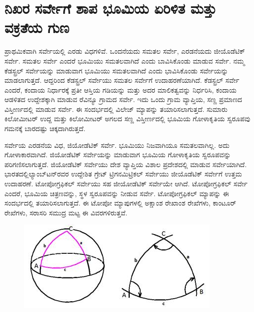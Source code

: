 
\chapter{ನಿಖರ ಸರ್ವೇಗೆ ಶಾಪ ಭೂಮಿಯ ಏರಿಳಿತ ಮತ್ತು ವಕ್ರತೆಯ ಗುಣ}

ಪ್ರಾಥಮಿಕವಾಗಿ ಸರ್ವೇಯಲ್ಲಿ ಎರಡು ವಿಧಗಳಿವೆ. ಒಂದನೆಯದು ಸಮತಲ ಸರ್ವೇ, ಎರಡನೆಯದು ಜೀಯೊಡೆಟಿಕ್​ ಸರ್ವೇ. ಸಮತಲ ಸರ್ವೇ ಎಂದರೆ ಭೂಮಿಯು ಸಮತಲವಾಗಿದೆ ಎಂದು ಬಾವಿಸಿಕೊಂಡು ಮಾಡುವ ಸರ್ವೇ. ನಮ್ಮ ಕೆಡಸ್ಟ್ರಲ್​ ಸರ್ವೇಯನ್ನು ಮಾಡುವಾಗ ಭೂಮಿಯು ಸಮತಲವಾಗಿದೆ ಎಂದು ಭಾವಿಸಿಕೊಂಡು ಸರ್ವೇಯನ್ನು ಮಾಡಲಾಗುತ್ತದೆ. ಆದ್ದರಿಂದ ಕೆಡಸ್ಟ್ರಲ್​ ಸರ್ವೇಯು ಸಮತಲ ಸರ್ವೇಗೆ ಉದಾಹರಣೆಯಾಗಿದೆ. ಕೆಡಸ್ಟ್ರಲ್​ ಸರ್ವೇ ಎಂದರೆ, ಕಂದಾಯ ನಿರ್ಧಾರಕ್ಕೆ ಪ್ರತೀ ಆಸ್ತಿಯ ಗಡಿಯನ್ನು ಮತ್ತು ಅದರ ಮಾಲಿಕತ್ವವನ್ನು ನಿರ್ಧರಿಸಿ, ಕಂದಾಯ ಆಡಳಿತದ ಉದ್ದೇಶಕ್ಕಾಗಿ ಮಾಡುವ ರೆವಿನ್ಯೂ ಗ್ರಾಮದ ಸರ್ವೇ. ಇದು ಒಂದು ಗ್ರಾಮ ವ್ಯಾಪ್ತಿಯ, ಸಣ್ಣ ಪ್ರಮಾಣದ ವಿಸ್ತೀರ್ಣದಲ್ಲಿ ಮಾಡುವ ಸರ್ವೇ. ಈ ಸಂದರ್ಭದಲ್ಲಿ ವಿಲೇಜ್​ ಮ್ಯಾಪನ್ನು ತಯಾರಿಸಲಾಗುತ್ತದೆ. ಸುಮಾರು  ಕಿಲೋಮೀಟರ್​ ಉದ್ದ ಮತ್ತು  ಕಿಲೋಮೀಟರ್​ ಅಗಲದ ಸಣ್ಣ ವಿಸ್ತೀರ್ಣದಲ್ಲಿ ಭೂಮಿಯ ಗೋಳಾಕೃತಿಯ ಸ್ವರೂಪವು ಗಮನಕ್ಕೆ ಬಾರದಷ್ಟು ಚಿಕ್ಕದಾಗಿರುತ್ತದೆ.

ಸರ್ವೇಯ ಎರಡನೆಯ ವಿಧ, ಜಿಯೋಡೆಟಿಕ್​ ಸರ್ವೇ. ಭೂಮಿಯು ನಿಜವಾಗಿಯೂ ಸಮತಲವಾಗಿಲ್ಲ. ಅದು ಗೋಳಾಕಾರವಾಗಿದೆ. ಜಿಯೋಡೆಟಿಕ್​ ಸರ್ವೇಯನ್ನು ಮಾಡುವಾಗ ಭೂಮಿಯ ಗೋಳಾಕೃತಿಯ ಸ್ವರೂಪವನ್ನು ಪರಿಗಣಿಸಲಾಗುತ್ತದೆ. ಜಿಯೋಡೆಟಿಕ್​ ಸರ್ವೇಯು ದೇಶ ವ್ಯಾಪ್ತಿಯ ವಿಶಾಲ ಪ್ರದೇಶದಲ್ಲಿ ಮಾಡುವ ಸರ್ವೇಯಾಗಿದೆ. ಭಾರತದಲ್ಲಿ\break ಲ್ಯಾಂಬ್​ಟನ್​ರವರ ಉದ್ದೇಶಿತ ಗ್ರೇಟ್​ ಟ್ರಿಗನಮಿಟ್ರಿಕಲ್​ ಸರ್ವೇಯು ಜೀಯೊಡೆಟಿಕ್​ ಸರ್ವೇಗೆ ಉತ್ತಮ ಉದಾಹರಣೆ. ಟೋಪೋಗ್ರಫಿಕಲ್​ ಸರ್ವೇಯು ಸಹ ಜೀಯೋಡೆಟಿಕ್​ ಸರ್ವೇಯೇ ಆಗಿದೆ. ಟೋಪೋಗ್ರಫಿಕಲ್​ ಸರ್ವೇ ಎಂದರೆ, ಭೂಮಿಯ ಚಿತ್ರಣವನ್ನು, ಸ್ಥಳ ಸ್ವರೂಪವನ್ನು ನೀಡುವ ಸರ್ವೇ. ಟೋಪೋಗ್ರಫಿಕಲ್​ ಮ್ಯಾಪನ್ನು ಈ ಸಂದರ್ಭದಲ್ಲಿ ತಯಾರಿಸಲಾಗುತ್ತದೆ. ಈ ಟೋಪೋ ಮ್ಯಾಪುಗಳಲ್ಲಿ ಅಕ್ಷಾಂಶ ರೇಖಾಂಶ ರೇಖೆಗಳು, ಕಾಂಟೂರ್​ ರೇಖೆಗಳು, ಸರಾಸರಿ ಸಮುದ್ರ ಮಟ್ಟ ಈ ವಿವರಗಳಿರುತ್ತವೆ.

\begin{figure}
\includegraphics[scale=0.6]{"images/image001.jpg"}
\end{figure}

